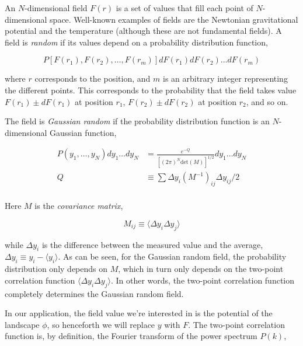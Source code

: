 \documentclass[12pt]{article}
\begin{document}
An $N$-dimensional field $F(r)$ is a set of values that fill each point of $N$-dimensional space. Well-known examples of fields are the Newtonian gravitational potential and the temperature (although these are not fundamental fields). A field is \emph{random} if its values depend on a probability distribution function,

\begin{equation}
P[F(r_1), F(r_2), \ldots, F(r_m)]dF(r_1)dF(r_2)\ldots dF(r_m)
\end{equation}

\noindent where $r$ corresponds to the position, and $m$ is an arbitrary integer representing the different points. This corresponds to the probability that the field takes value $F(r_1) \pm dF(r_1)$ at position $r_1$, $F(r_2) \pm dF(r_2)$ at position $r_2$, and so on. 

The field is \emph{Gaussian random} if the probability distribution function is an $N$-dimensional Gaussian function,

\begin{equation} \label{MultivariateGaussian}
\begin{split}
P(y_1,\ldots,y_N)dy_1\ldots dy_N &= \frac{e^{-Q}}{[(2\pi)^N \mathrm{det}(M)]^{1/2}} dy_1\ldots dy_N\\
Q &\equiv \sum \Delta y_i (M^{-1})_{ij} \Delta y_{ij} / 2 \\
\end{split}
\end{equation}

Here $M$ is the \emph{covariance matrix}, 

\begin{equation}
M_{ij} \equiv \langle \Delta y_i \Delta y_j \rangle
\end{equation}

\noindent while $\Delta y_i$ is the difference between the measured value and the average, $\Delta y_i \equiv y_i - \langle y_i \rangle$. As can be seen, for the Gaussian random field, the probability distribution only depends on $M$, which in turn only depends on the two-point correlation function $\langle \Delta y_i \Delta y_j \rangle$. In other words, the two-point correlation function completely determines the Gaussian random field.

In our application, the field value we're interested in is the potential of the landscape $\phi$, so henceforth we will replace $y$ with $F$. The two-point correlation function is, by definition, the Fourier transform of the power spectrum $P(k)$,
\end{document}
